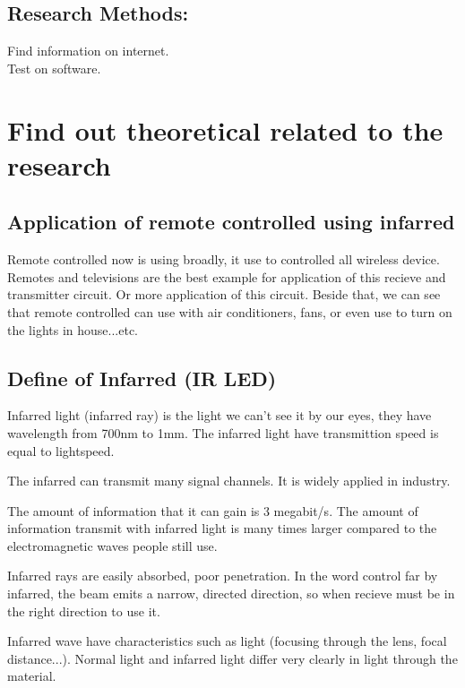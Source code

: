\documentclass[a4paper]{report}
\begin{document}
    \section{Research Methods:}
        Find information on internet. \\
        Test on software.


    \chapter{Find out theoretical related to the research}
    \section{Application of remote controlled using infarred}
        Remote controlled now is using broadly, it use to controlled all wireless device. 
        Remotes and televisions are the best example for application of this recieve and transmitter 
        circuit. Or more application of this circuit. Beside that, we can see that remote controlled 
        can use with air conditioners, fans, or even use to turn on the lights in house...etc.
        \section{Define of Infarred (IR LED)}
            Infarred light (infarred ray) is the light we can't see it by our eyes, 
            they have wavelength from 700nm to 1mm. The infarred light have transmittion speed 
            is equal to lightspeed.
            \linebreak
            \par The infarred can transmit many signal channels. It is widely 
            applied in industry.
            \linebreak
            \par The amount of information that it can gain is 3 megabit/s. The 
            amount of information transmit with infarred light is many times larger 
            compared to the electromagnetic waves people still use.
            \linebreak
            \par Infarred rays are easily absorbed, poor penetration. In the word control 
            far by infarred, the beam emits a narrow, directed direction, so when recieve 
            must be in the right direction to use it.
            \linebreak
            \par Infarred wave have characteristics such as light (focusing through the lens, focal distance...). 
            Normal light and infarred light differ very clearly in light through the material.
            \
\end{document}
